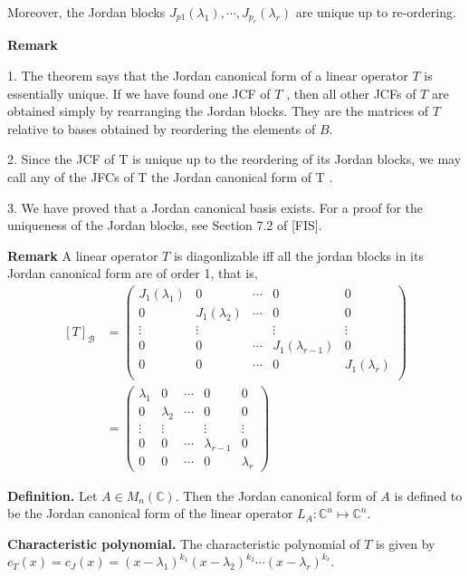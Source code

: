 \documentclass[10pt,landscape]{article}
\begin{document}
\begin{multicols}{4}
Moreover, the Jordan blocks $J_{p1}(\lambda_1), \cdots, J_{p_r}(\lambda_r)$ are unique up to re-ordering.

\textbf{Remark}

1. The theorem says that the Jordan canonical form of a linear operator $T$ is essentially unique. If we have found one JCF of $T$ , then all other JCFs of $T$ are obtained simply by rearranging the Jordan blocks. They are the matrices of $T$ relative to bases obtained by reordering the elements of $B$.

2. Since the JCF of T is unique up to the reordering of its Jordan blocks, we may call any of the JFCs of T the Jordan canonical form of T .

3. We have proved that a Jordan canonical basis exists. For a proof for the uniqueness of the Jordan blocks, see Section 7.2 of [FIS].

\textbf{Remark} A linear operator $T$ is diagonlizable iff all the jordan blocks in its Jordan canonical form are of order 1, that is, 
$$
\begin{aligned}
[T]_{\mathcal{B}}&=\left(\begin{array}{ccccc}
J_{1}\left(\lambda_{1}\right) & 0 & \cdots & 0 & 0 \\
0 & J_{1}\left(\lambda_{2}\right) & \cdots & 0 & 0 \\
\vdots & \vdots & & \vdots & \vdots \\
0 & 0 & \cdots & J_{1}\left(\lambda_{r-1}\right) & 0 \\
0 & 0 & \cdots & 0 & J_{1}\left(\lambda_{r}\right) \\
\end{array}\right) \\
&=\left(\begin{array}{ccccc}
\lambda_{1} & 0 & \cdots & 0 & 0 \\
0 & \lambda_{2} & \cdots & 0 & 0 \\
\vdots & \vdots & & \vdots & \vdots \\
0 & 0 & \cdots & \lambda_{r-1} & 0 \\
0 & 0 & \cdots & 0 & \lambda_{r}
\end{array}\right)
\end{aligned}
$$

\textbf{Definition.} Let $A \in M_n(\mathbb{C})$. Then the Jordan canonical form of $A$ is defined to be the Jordan canonical form of the linear operator $L_A: \mathbb{C}^n \mapsto \mathbb{C}^n$.

\textbf{Characteristic polynomial.} The characteristic polynomial of $T$ is given by $c_T(x) = c_J(x) = (x - \lambda_1)^{k_1} (x - \lambda_2)^{k_2} \cdots (x - \lambda_r)^{k_r}$.


\end{multicols}
\end{document}
